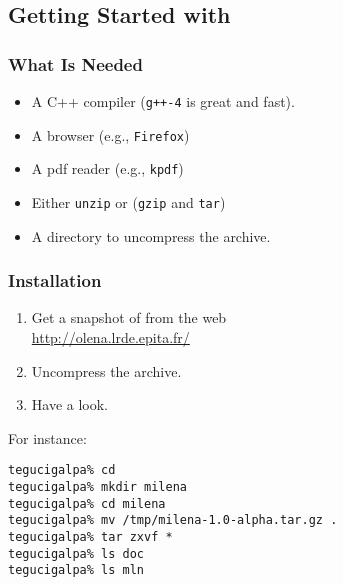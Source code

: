 \documentclass{beamer}
\begin{document}
\subsection{Getting Started with \mln}


\begin{frame}
  \frametitle{What Is Needed}

  \begin{itemize}
  \item A C++ compiler (\texttt{g++-4} is great and fast).
  \item A browser (e.g., \texttt{Firefox})
  \item A pdf reader (e.g., \texttt{kpdf})
  \item Either \texttt{unzip} or (\texttt{gzip} and \texttt{tar})
  \item A directory to uncompress the \mln archive.
  \end{itemize}

\end{frame}


\begin{frame}[fragile]
  \frametitle{Installation}

  \begin{enumerate}
    \item Get a snapshot of \mln from the web\\
      {\scriptsize \url{http://olena.lrde.epita.fr/}}
    \item Uncompress the archive.
    \item Have a look. %
  \end{enumerate}

  For instance:

{\tiny
\begin{verbatim}
tegucigalpa% cd
tegucigalpa% mkdir milena
tegucigalpa% cd milena
tegucigalpa% mv /tmp/milena-1.0-alpha.tar.gz .
tegucigalpa% tar zxvf *
tegucigalpa% ls doc
tegucigalpa% ls mln
\end{verbatim}
}

\end{frame}
\end{document}
